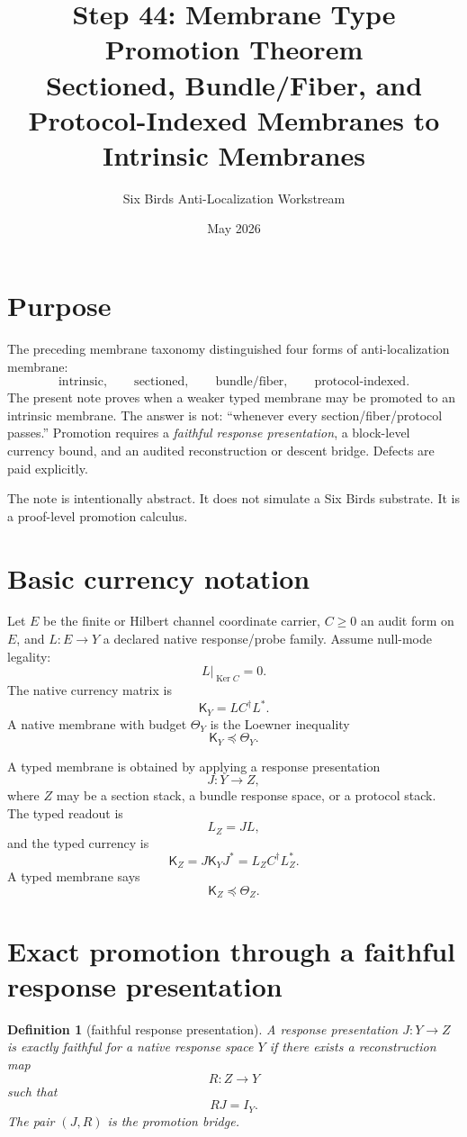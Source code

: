 \documentclass[11pt]{article}
\title{Step 44: Membrane Type Promotion Theorem\\
\large Sectioned, Bundle/Fiber, and Protocol-Indexed Membranes to Intrinsic Membranes}
\author{Six Birds Anti-Localization Workstream}
\date{May 2026}
\newtheorem{definition}[theorem]{Definition}
\newcommand{\K}{\mathsf K}
\newcommand{\Th}{\Theta}
\newcommand{\Ker}{\operatorname{Ker}}
\newcommand{\Loewner}{\preceq}
\begin{document}
\maketitle

\section{Purpose}

The preceding membrane taxonomy distinguished four forms of anti-localization membrane:
\[
\text{intrinsic},\qquad \text{sectioned},\qquad \text{bundle/fiber},\qquad \text{protocol-indexed}.
\]
The present note proves when a weaker typed membrane may be promoted to an intrinsic membrane.  The answer is not: ``whenever every section/fiber/protocol passes.''  Promotion requires a \emph{faithful response presentation}, a block-level currency bound, and an audited reconstruction or descent bridge.  Defects are paid explicitly.

The note is intentionally abstract.  It does not simulate a Six Birds substrate.  It is a proof-level promotion calculus.

\section{Basic currency notation}

Let \(E\) be the finite or Hilbert channel coordinate carrier, \(C\ge0\) an audit form on \(E\), and \(L:E\to Y\) a declared native response/probe family.  Assume null-mode legality:
\[
L|_{\Ker C}=0.
\]
The native currency matrix is
\[
\K_Y = L C^\dagger L^*.
\]
A native membrane with budget \(\Th_Y\) is the Loewner inequality
\[
\K_Y\Loewner \Th_Y.
\]

A typed membrane is obtained by applying a response presentation
\[
J:Y\to Z,
\]
where \(Z\) may be a section stack, a bundle response space, or a protocol stack.  The typed readout is
\[
L_Z = J L,
\]
and the typed currency is
\[
\K_Z = J\K_YJ^* = L_Z C^\dagger L_Z^*.
\]
A typed membrane says
\[
\K_Z\Loewner\Th_Z.
\]

\section{Exact promotion through a faithful response presentation}

\begin{definition}[faithful response presentation]
A response presentation \(J:Y\to Z\) is exactly faithful for a native response space \(Y\) if there exists a reconstruction map
\[
R:Z\to Y
\]
such that
\[
RJ=I_Y.
\]
The pair \((J,R)\) is the promotion bridge.
\end{definition}
\end{document}
